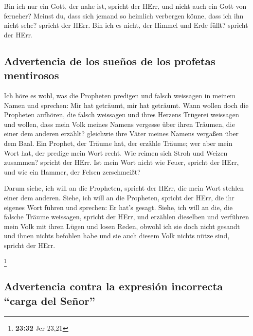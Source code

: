  Bin ich nur ein Gott, der nahe ist, spricht der HErr,
und nicht auch ein Gott von ferneher?  Meinst du, dass
sich jemand so heimlich verbergen könne, dass ich ihn nicht sehe?
spricht der HErr. Bin ich es nicht, der Himmel und Erde füllt? spricht
der HErr.

\hypertarget{advertencia-de-los-sueuxf1os-de-los-profetas-mentirosos}{%
\subsection{Advertencia de los sueños de los profetas
mentirosos}\label{advertencia-de-los-sueuxf1os-de-los-profetas-mentirosos}}

 Ich höre es wohl, was die Propheten predigen und falsch
weissagen in meinem Namen und sprechen: Mir hat geträumt, mir hat
geträumt.  Wann wollen doch die Propheten aufhören, die
falsch weissagen und ihres Herzens Trügerei weissagen 
und wollen, dass mein Volk meines Namens vergesse über ihren Träumen,
die einer dem anderen erzählt? gleichwie ihre Väter meines Namens
vergaßen über dem Baal.  Ein Prophet, der Träume hat, der
erzähle Träume; wer aber mein Wort hat, der predige mein Wort recht. Wie
reimen sich Stroh und Weizen zusammen? spricht der HErr. 
Ist mein Wort nicht wie Feuer, spricht der HErr, und wie ein Hammer, der
Felsen zerschmeißt?

 Darum siehe, ich will an die Propheten, spricht der
HErr, die mein Wort stehlen einer dem anderen.  Siehe,
ich will an die Propheten, spricht der HErr, die ihr eigenes Wort führen
und sprechen: Er hat's gesagt.  Siehe, ich will an die,
die falsche Träume weissagen, spricht der HErr, und erzählen dieselben
und verführen mein Volk mit ihren Lügen und losen Reden, obwohl ich sie
doch nicht gesandt und ihnen nichts befohlen habe und sie auch diesem
Volk nichts nütze sind, spricht der HErr.

\footnote{\textbf{23:32} Jer 23,21}

\hypertarget{advertencia-contra-la-expresiuxf3n-incorrecta-carga-del-seuxf1or}{%
\subsection{Advertencia contra la expresión incorrecta ``carga del
Señor''}\label{advertencia-contra-la-expresiuxf3n-incorrecta-carga-del-seuxf1or}}

